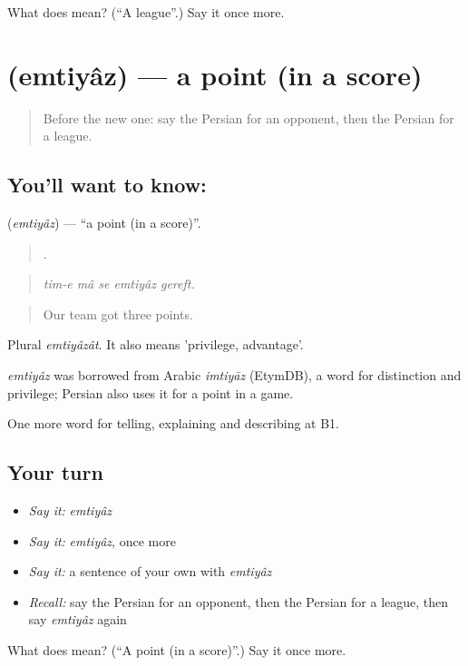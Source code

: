 \begin{tcolorbox}[breakable,colback=teal!4,colframe=teal!35!black,title={Before you move on}]
What does  mean? (\textquotedblleft{}A league\textquotedblright{}.) Say it once more.
\end{tcolorbox}
\section[\texorpdfstring{\fa{امتیاز} (emtiyâz)}{امتیاز (emtiyâz)}]{ (emtiyâz) — a point (in a score)}

\label{lesson:FA-C512-emtiyaz}



\begin{quote}
Before the new one: say the Persian for an opponent, then the Persian for a league.
\end{quote}

\subsection*{You'll want to know: }
\textbf{} (\emph{emtiyâz}) — \textquotedblleft{}a point (in a score)\textquotedblright{}.

\begin{quote}
    .
\end{quote}

\begin{quote}
\emph{tim-e mâ se emtiyâz gereft.}
\end{quote}

\begin{quote}
Our team got three points.
\end{quote}

Plural \emph{emtiyâzât}. It also means 'privilege, advantage'.

\begin{cousinweb}
\emph{emtiyâz} was borrowed from Arabic \emph{imtiyāz} (EtymDB), a word for distinction and privilege; Persian also uses it for a point in a game.
\end{cousinweb}

\begin{grammarlens}[title={What you've built}]
One more word for telling, explaining and describing at B1.
\end{grammarlens}

\subsection*{Your turn}
\begin{itemize}
\raggedright
  \item \emph{Say it:} \emph{emtiyâz}
  \item \emph{Say it:} \emph{emtiyâz}, once more
  \item \emph{Say it:} a sentence of your own with \emph{emtiyâz}
  \item \emph{Recall:} say the Persian for an opponent, then the Persian for a league, then say \emph{emtiyâz} again
\end{itemize}

\begin{tcolorbox}[breakable,colback=teal!4,colframe=teal!35!black,title={Before you move on}]
What does  mean? (\textquotedblleft{}A point (in a score)\textquotedblright{}.) Say it once more.
\end{tcolorbox}

